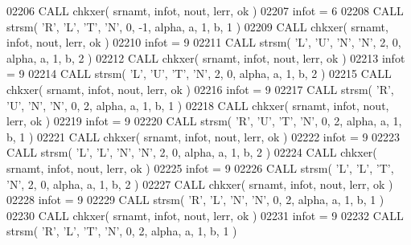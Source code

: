 \begin{DoxyCode}
02206       \textcolor{keyword}{CALL }chkxer( srnamt, infot, nout, lerr, ok )
02207       infot = 6
02208       \textcolor{keyword}{CALL }strsm( \textcolor{stringliteral}{'R'}, \textcolor{stringliteral}{'L'}, \textcolor{stringliteral}{'T'}, \textcolor{stringliteral}{'N'}, 0, -1, alpha, a, 1, b, 1 )
02209       \textcolor{keyword}{CALL }chkxer( srnamt, infot, nout, lerr, ok )
02210       infot = 9
02211       \textcolor{keyword}{CALL }strsm( \textcolor{stringliteral}{'L'}, \textcolor{stringliteral}{'U'}, \textcolor{stringliteral}{'N'}, \textcolor{stringliteral}{'N'}, 2, 0, alpha, a, 1, b, 2 )
02212       \textcolor{keyword}{CALL }chkxer( srnamt, infot, nout, lerr, ok )
02213       infot = 9
02214       \textcolor{keyword}{CALL }strsm( \textcolor{stringliteral}{'L'}, \textcolor{stringliteral}{'U'}, \textcolor{stringliteral}{'T'}, \textcolor{stringliteral}{'N'}, 2, 0, alpha, a, 1, b, 2 )
02215       \textcolor{keyword}{CALL }chkxer( srnamt, infot, nout, lerr, ok )
02216       infot = 9
02217       \textcolor{keyword}{CALL }strsm( \textcolor{stringliteral}{'R'}, \textcolor{stringliteral}{'U'}, \textcolor{stringliteral}{'N'}, \textcolor{stringliteral}{'N'}, 0, 2, alpha, a, 1, b, 1 )
02218       \textcolor{keyword}{CALL }chkxer( srnamt, infot, nout, lerr, ok )
02219       infot = 9
02220       \textcolor{keyword}{CALL }strsm( \textcolor{stringliteral}{'R'}, \textcolor{stringliteral}{'U'}, \textcolor{stringliteral}{'T'}, \textcolor{stringliteral}{'N'}, 0, 2, alpha, a, 1, b, 1 )
02221       \textcolor{keyword}{CALL }chkxer( srnamt, infot, nout, lerr, ok )
02222       infot = 9
02223       \textcolor{keyword}{CALL }strsm( \textcolor{stringliteral}{'L'}, \textcolor{stringliteral}{'L'}, \textcolor{stringliteral}{'N'}, \textcolor{stringliteral}{'N'}, 2, 0, alpha, a, 1, b, 2 )
02224       \textcolor{keyword}{CALL }chkxer( srnamt, infot, nout, lerr, ok )
02225       infot = 9
02226       \textcolor{keyword}{CALL }strsm( \textcolor{stringliteral}{'L'}, \textcolor{stringliteral}{'L'}, \textcolor{stringliteral}{'T'}, \textcolor{stringliteral}{'N'}, 2, 0, alpha, a, 1, b, 2 )
02227       \textcolor{keyword}{CALL }chkxer( srnamt, infot, nout, lerr, ok )
02228       infot = 9
02229       \textcolor{keyword}{CALL }strsm( \textcolor{stringliteral}{'R'}, \textcolor{stringliteral}{'L'}, \textcolor{stringliteral}{'N'}, \textcolor{stringliteral}{'N'}, 0, 2, alpha, a, 1, b, 1 )
02230       \textcolor{keyword}{CALL }chkxer( srnamt, infot, nout, lerr, ok )
02231       infot = 9
02232       \textcolor{keyword}{CALL }strsm( \textcolor{stringliteral}{'R'}, \textcolor{stringliteral}{'L'}, \textcolor{stringliteral}{'T'}, \textcolor{stringliteral}{'N'}, 0, 2, alpha, a, 1, b, 1 )

\end{DoxyCode}
